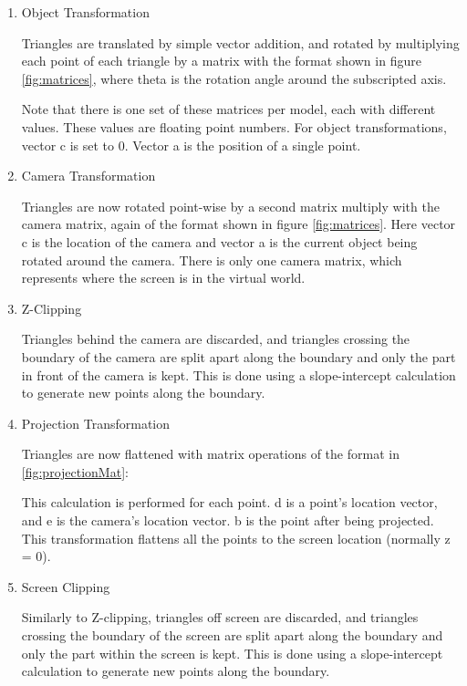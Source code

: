 \documentclass[onecolumn]{IEEEtran}
\begin{document}
\begin{enumerate}
\item Object Transformation

Triangles are translated by simple vector addition, and rotated by multiplying each point of each triangle by a matrix with the format shown in figure \ref{fig:matrices}, where theta is the rotation angle around the subscripted axis.


Note that there is one set of these matrices per model, each with different values.  These values are floating point numbers.  For object transformations, vector c is set to 0.  Vector a is the position of a single point.

\item Camera Transformation

Triangles are now rotated point-wise by a second matrix multiply with the camera matrix, again of the format shown in figure \ref{fig:matrices}.  Here vector c is the location of the camera and vector a is the current object being rotated around the camera.   There is only one camera matrix, which represents where the screen is in the virtual world.

\item Z-Clipping

Triangles behind the camera are discarded, and triangles crossing the boundary of the camera are split apart along the boundary and only the part in front of the camera is kept.  This is done using a slope-intercept calculation to generate new points along the boundary.

\item Projection Transformation

Triangles are now flattened with matrix operations of the format in \ref{fig:projectionMat}:


This calculation is performed for each point.  d is a point’s location vector, and e is the camera’s location vector.  b is the point after being projected.  This transformation flattens all the points to the screen location (normally z = 0).
\item Screen Clipping

Similarly to Z-clipping, triangles off screen are discarded, and triangles crossing the boundary of the screen are split apart along the boundary and only the part within the screen is kept.  This is done using a slope-intercept calculation to generate new points along the boundary.


\end{enumerate}
\end{document}
